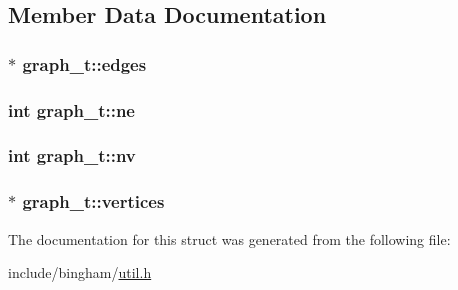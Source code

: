 \subsection{Member Data Documentation}
\hypertarget{structgraph__t_affa31737d3a3289d654ff1a3967d2369}{
\subsubsection[{edges}]{$\ast$ {\bf graph\_\-t::edges}}}
\label{structgraph__t_affa31737d3a3289d654ff1a3967d2369}
\hypertarget{structgraph__t_a4f79ef91eec39c1942041cc2f1d63eba}{
\subsubsection[{ne}]{\setlength{\rightskip}{0pt plus 5cm}int {\bf graph\_\-t::ne}}}
\label{structgraph__t_a4f79ef91eec39c1942041cc2f1d63eba}
\hypertarget{structgraph__t_a3142f6ebcc735e2b2ec64ff26e25c7ab}{
\subsubsection[{nv}]{\setlength{\rightskip}{0pt plus 5cm}int {\bf graph\_\-t::nv}}}
\label{structgraph__t_a3142f6ebcc735e2b2ec64ff26e25c7ab}
\hypertarget{structgraph__t_a49c6f42fa769dc88d849d993cf7a1a86}{
\subsubsection[{vertices}]{$\ast$ {\bf graph\_\-t::vertices}}}
\label{structgraph__t_a49c6f42fa769dc88d849d993cf7a1a86}


The documentation for this struct was generated from the following file:\begin{DoxyCompactItemize}
\item 
include/bingham/\hyperlink{util_8h}{util.h}\end{DoxyCompactItemize}
